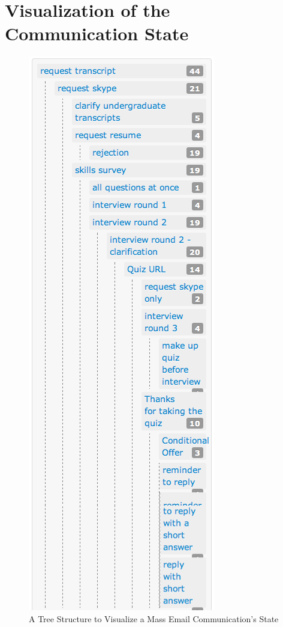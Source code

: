 \chapter{Visualization of the Communication State}
\label{app:VisuCommStat}


\begin{figure}[htbp]
	\centering
	\includegraphics[scale=0.55]{imgs/VisualizationOfCommunicationState.png}
	\caption[A Tree Structure to Visualize a Mass Email Communication's State]{A Tree Structure to Visualize a Mass Email Communication's State}
	\label{fig:VisualizationOfCommunicationState}
\end{figure}